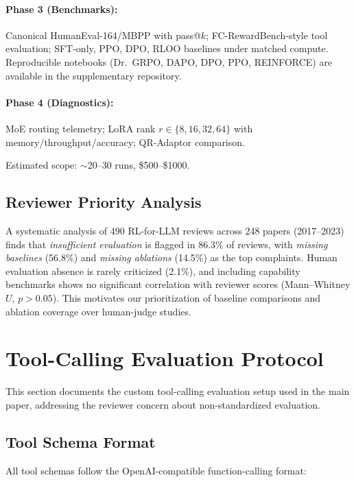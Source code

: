 \documentclass{article}
\begin{document}
\paragraph{Phase 3 (Benchmarks):} Canonical HumanEval-164/MBPP with pass@$k$; FC-RewardBench-style tool evaluation; SFT-only, PPO, DPO, RLOO baselines under matched compute. Reproducible notebooks (Dr.\ GRPO, DAPO, DPO, PPO, REINFORCE) are available in the supplementary repository.

\paragraph{Phase 4 (Diagnostics):} MoE routing telemetry; LoRA rank $r \in \{8, 16, 32, 64\}$ with memory/throughput/accuracy; QR-Adaptor comparison.

Estimated scope: $\sim$20--30 runs, \$500--\$1000.

\subsection{Reviewer Priority Analysis}

A systematic analysis of 490 RL-for-LLM reviews across 248 papers (2017--2023) finds that \emph{insufficient evaluation} is flagged in 86.3\% of reviews, with \emph{missing baselines} (56.8\%) and \emph{missing ablations} (14.5\%) as the top complaints. Human evaluation absence is rarely criticized (2.1\%), and including capability benchmarks shows no significant correlation with reviewer scores (Mann--Whitney $U$, $p > 0.05$). This motivates our prioritization of baseline comparisons and ablation coverage over human-judge studies.

\section{Tool-Calling Evaluation Protocol}

This section documents the custom tool-calling evaluation setup used in the main paper, addressing the reviewer concern about non-standardized evaluation.

\subsection{Tool Schema Format}

All tool schemas follow the OpenAI-compatible function-calling format:
\end{document}
